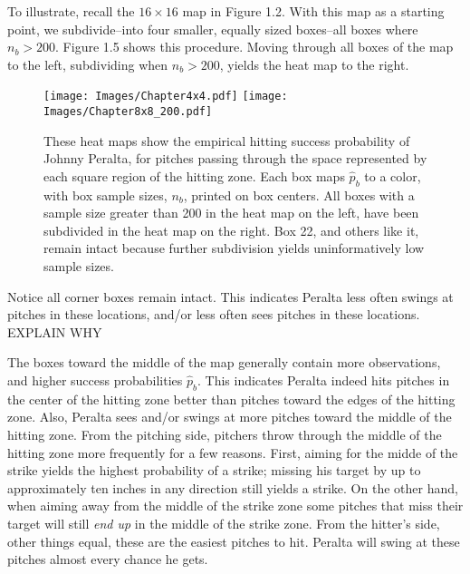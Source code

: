 To illustrate, recall the $16 \times 16$ map in Figure 1.2. With this map as a starting point, we subdivide--into four smaller, equally sized boxes--all boxes where $n_{b} > 200$. Figure 1.5 shows this procedure. Moving through all boxes of the map to the left, subdividing when $n_{b} > 200$, yields the heat map to the right.
        \begin{figure}[H]
      	\centering
      	\texttt{[image: Images/Chapter4x4.pdf]} 
      	\texttt{[image: Images/Chapter8x8\_200.pdf]} 
      	\caption{These heat maps show the empirical hitting success probability of Johnny Peralta, for pitches passing through the space represented by each square region of the hitting zone.  Each box maps $\hat{p}_{b}$ to a color, with box sample sizes, $n_{b}$, printed on box centers. All boxes with a sample size greater than 200 in the heat map on the left, have been subdivided in the heat map on the right. Box 22, and others like it, remain intact because further subdivision yields uninformatively low sample sizes.}
      	\end{figure} 
Notice all corner boxes remain intact. This indicates Peralta less often swings at pitches in these locations, and/or less often sees pitches in these locations. EXPLAIN WHY


The boxes toward the middle of the map generally contain more observations, and higher success probabilities $\hat{p}_{b}$. This indicates Peralta indeed hits pitches in the center of the hitting zone better than pitches toward the edges of the hitting zone. Also, Peralta sees and/or swings at more pitches toward the middle of the hitting zone. From the pitching side, pitchers throw through the middle of the hitting zone more frequently for a few reasons. First, aiming for the midde of the strike yields the highest probability of a strike; missing his target by up to approximately ten inches in any direction still yields a strike. On the other hand, when aiming away from the middle of the strike zone some pitches that miss their target will still {\it end up} in the middle of the strike zone. From the hitter's side, other things equal, these are the easiest pitches to hit. Peralta will swing at these pitches almost every chance he gets.

